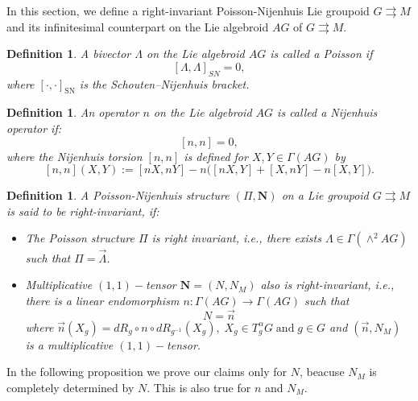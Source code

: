 \documentclass{article}
\newcommand{\SN}{\mathrm{SN}}
\newtheorem{definition}[theorem]{Definition}
\begin{document}
In this section, we define a right-invariant Poisson-Nijenhuis Lie groupoid $G\rightrightarrows M$  and its infinitesimal counterpart on the Lie algebroid $AG$ of $G\rightrightarrows M$.
\begin{definition}
  A bivector $\Lambda$ on the Lie algebroid $AG$ is called a Poisson if 
 \begin{equation}\label{PBVL}
 [\Lambda,\Lambda]_{SN}=0,
 \end{equation}
 where $[\cdot,\cdot]_{\SN}$ is the Schouten–Nijenhuis bracket.
 \end{definition}
 \begin{definition}
   An operator $n$ on the Lie algebroid $AG$ is called  a Nijenhuis operator if:
    \begin{equation}\label{NO}
    [n, n] = 0,
    \end{equation}
        where the Nijenhuis torsion $[n,n]$ is defined for $X, Y \in \Gamma(AG)$ by
    \begin{equation}\label{NT}
    [n,n](X,Y) := [nX, nY] - n\big([nX, Y] + [X, nY] - n[X,Y]\big).
    \end{equation}
    \end{definition}
\begin{definition}\label{RIPNS}
A Poisson-Nijenhuis structure $(\Pi,\mathbf{N})$ on a Lie groupoid $G\rightrightarrows M$ is said to be right-invariant, if:
\begin{itemize}
\item[1.] The Poisson structure $\Pi$ is right invariant, i.e., there exists $\Lambda \in \Gamma(\wedge^2 AG)$ such that $\Pi=\overrightarrow{\Lambda}$.
\item[2.] Multiplicative $(1,1)-$tensor $\mathbf{N}=(N,N_M)$ also is right-invariant, i.e., there is a linear endomorphism $n:\Gamma(AG) \to \Gamma(AG)$ 
such that
$$N=\overrightarrow{n}$$
where $ \overrightarrow{n}(X_g)=dR_g \circ n\circ dR_{g^{-1}}(X_g),\; X_g\in T^{\alpha}_g G \; \text{and} \; g\in G$ and $(\overrightarrow{n}, N_M)$ is a multiplicative $(1, 1)-$tensor.

\end{itemize}

\end{definition}
In the following proposition we prove our claims only for $N$, beacuse $N_M$ is completely determined by $N$. This is also true for $n$ and $N_M$.
\end{document}
